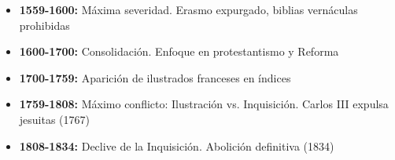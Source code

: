 \documentclass[12pt,a4paper]{article}
\begin{document}
\begin{itemize}
    \item \textbf{1559-1600:} Máxima severidad. Erasmo expurgado, biblias vernáculas prohibidas
    \item \textbf{1600-1700:} Consolidación. Enfoque en protestantismo y Reforma
    \item \textbf{1700-1759:} Aparición de ilustrados franceses en índices
    \item \textbf{1759-1808:} Máximo conflicto: Ilustración vs. Inquisición. Carlos III expulsa jesuitas (1767)
    \item \textbf{1808-1834:} Declive de la Inquisición. Abolición definitiva (1834)
\end{itemize}
\end{document}
